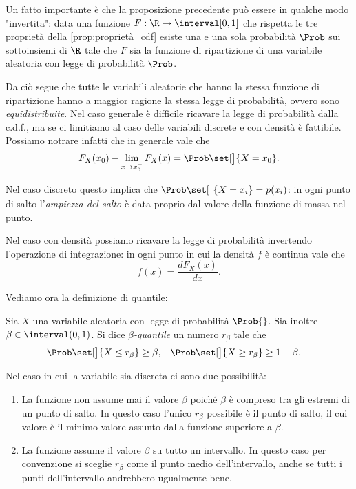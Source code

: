 Un fatto importante è che la proposizione precedente può essere in qualche modo "invertita": data una funzione $F : \R \to \interval[{0, 1}]$ che rispetta le tre proprietà della \autoref{prop:proprietà_cdf} esiste una e una sola probabilità $\Prob$ sui sottoinsiemi di $\R$ tale che $F$ sia la funzione di ripartizione di una variabile aleatoria con legge di probabilità $\Prob$.

Da ciò segue che tutte le variabili aleatorie che hanno la stessa funzione di ripartizione hanno a maggior ragione la stessa legge di probabilità, ovvero sono \emph{equidistribuite}. Nel caso generale è difficile ricavare la legge di probabilità dalla c.d.f., ma se ci limitiamo al caso delle variabili discrete e con densità è fattibile. Possiamo notrare infatti che in generale vale che \[
    F_X(x_0) - \lim_{x \to x_0^-} F_X(x) = \Prob\set[\big]{X = x_0}.    
\]

Nel caso discreto questo implica che $\Prob\set[\big]{X = x_i} = p(x_i)$: in ogni punto di salto l'\emph{ampiezza del salto} è data proprio dal valore della funzione di massa nel punto.

Nel caso con densità possiamo ricavare la legge di probabilità invertendo l'operazione di integrazione: in ogni punto in cui la densità $f$ è continua vale che \[
    f(x) = \frac{dF_X(x)}{dx}.    
\]

Vediamo ora la definizione di quantile:
\begin{definition}
    [Quantile]
    Sia $X$ una variabile aleatoria con legge di probabilità $\Prob{}$. Sia inoltre $\beta \in \interval({0, 1})$. Si dice \emph{$\beta$-quantile} un numero $r_\beta$ tale che \begin{align*}
        \Prob\set[\big]{X \leq r_\beta} \geq \beta,\quad &\Prob\set[\big]{X \geq r_\beta} \geq 1 - \beta.   
    \end{align*}
\end{definition}

Nel caso in cui la variabile sia discreta ci sono due possibilità:
\begin{enumerate}
    \item La funzione non assume mai il valore $\beta$ poiché $\beta$ è compreso tra gli estremi di un punto di salto.
    In questo caso l'unico $r_\beta$ possibile è il punto di salto, il cui valore è il minimo valore assunto dalla funzione superiore a $\beta$.

    \item La funzione assume il valore $\beta$ su tutto un intervallo. In questo caso per convenzione si sceglie $r_\beta$ come il punto medio dell'intervallo, anche se tutti i punti dell'intervallo andrebbero ugualmente bene.
\end{enumerate}
\begin{figure}[H]
    \begin{center}
        
    \end{center}
\end{figure}

